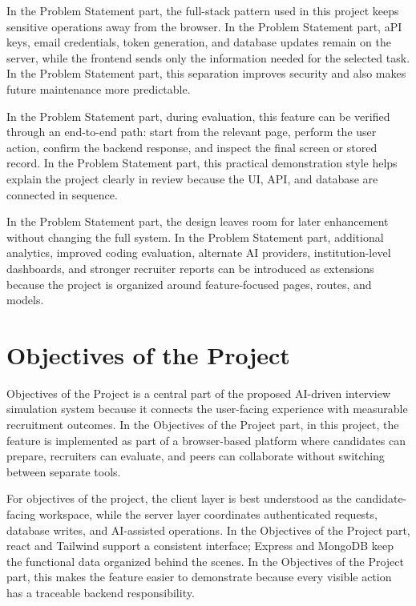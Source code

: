 \documentclass[12pt,a4paper]{report}
\begin{document}
In the Problem Statement part, the full-stack pattern used in this project keeps sensitive operations away from the browser. In the Problem Statement part, aPI keys, email credentials, token generation, and database updates remain on the server, while the frontend sends only the information needed for the selected task. In the Problem Statement part, this separation improves security and also makes future maintenance more predictable.


In the Problem Statement part, during evaluation, this feature can be verified through an end-to-end path: start from the relevant page, perform the user action, confirm the backend response, and inspect the final screen or stored record. In the Problem Statement part, this practical demonstration style helps explain the project clearly in review because the UI, API, and database are connected in sequence.


In the Problem Statement part, the design leaves room for later enhancement without changing the full system. In the Problem Statement part, additional analytics, improved coding evaluation, alternate AI providers, institution-level dashboards, and stronger recruiter reports can be introduced as extensions because the project is organized around feature-focused pages, routes, and models.


\section{Objectives of the Project}

Objectives of the Project is a central part of the proposed AI-driven interview simulation system because it connects the user-facing experience with measurable recruitment outcomes. In the Objectives of the Project part, in this project, the feature is implemented as part of a browser-based platform where candidates can prepare, recruiters can evaluate, and peers can collaborate without switching between separate tools.


For objectives of the project, the client layer is best understood as the candidate-facing workspace, while the server layer coordinates authenticated requests, database writes, and AI-assisted operations. In the Objectives of the Project part, react and Tailwind support a consistent interface; Express and MongoDB keep the functional data organized behind the scenes. In the Objectives of the Project part, this makes the feature easier to demonstrate because every visible action has a traceable backend responsibility.
\end{document}
